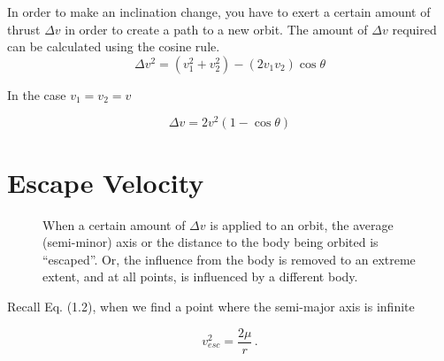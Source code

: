 \documentclass[12pt,a4paper]{article}
\numberwithin{equation}{section}
\begin{document}
In order to make an inclination change, you have to exert a certain amount of thrust $\Delta v$ in order to create a path to a new orbit. The amount of $\Delta v$ required can be calculated using the cosine rule.
\begin{equation}
\Delta v^2 = (v_1^2 + v_2^2) - (2 v_1 v_2) \cos \theta
\end{equation}
\begin{center}
	In the case $v_1 = v_2 = v$
\end{center}
\begin{equation}
	\Delta v = 2v^2 (1 - \cos \theta)
\end{equation}

\newpage

\section{Escape Velocity}

\begin{figure}[h]
	\centering
	\label{fig: 4}
	\caption{When a certain amount of $\Delta v$ is applied to an orbit, the average (semi-minor) axis or the distance to the body being orbited is ``escaped''. Or, the influence from the body is removed to an extreme extent, and at all points, is influenced by a different body.}
\end{figure}
Recall Eq. (1.2), when we find a point where the semi-major axis is infinite

\begin{equation}
	v_{esc}^2 = \frac{2 \mu}{r} \,.
\end{equation}
\end{document}

